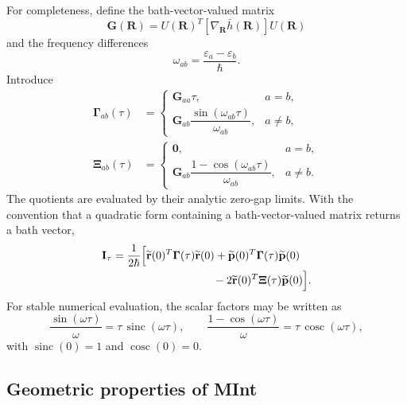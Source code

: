\documentclass[
  11pt,
  letterpaper,
  onehalfspacing,
  normalmargins,
  equalmargins,
  oneside
]{ut-thesis}
\begin{document}
For completeness, define the bath-vector-valued matrix
\begin{equation}
\mathbf G(\mathbf R)
=
U(\mathbf R)^T
\left[\nabla_{\mathbf R}\bar h(\mathbf R)\right]
U(\mathbf R)
\label{eq:ch5-G-matrix}
\end{equation}
and the frequency differences
\begin{equation}
\omega_{ab}
=
\frac{\varepsilon_a-\varepsilon_b}{\hbar}.
\label{eq:ch5-frequency-difference}
\end{equation}
Introduce
\begin{align}
\boldsymbol\Gamma_{ab}(\tau)
&=
\begin{cases}
\mathbf G_{aa}\tau,
& a=b,\\[3pt]
\mathbf G_{ab}
\dfrac{\sin(\omega_{ab}\tau)}{\omega_{ab}},
& a\neq b,
\end{cases}
\label{eq:ch5-Gamma}
\\
\boldsymbol\Xi_{ab}(\tau)
&=
\begin{cases}
\mathbf 0,
& a=b,\\[3pt]
\mathbf G_{ab}
\dfrac{1-\cos(\omega_{ab}\tau)}{\omega_{ab}},
& a\neq b.
\end{cases}
\label{eq:ch5-Xi}
\end{align}
The quotients are evaluated by their analytic zero-gap limits. With the
convention that a quadratic form containing a bath-vector-valued matrix
returns a bath vector,
\begin{align}
\mathbf I_\tau
&=
\frac{1}{2\hbar}
\Big[
\widetilde{\mathbf r}(0)^T
\boldsymbol\Gamma(\tau)
\widetilde{\mathbf r}(0)
+
\widetilde{\mathbf p}(0)^T
\boldsymbol\Gamma(\tau)
\widetilde{\mathbf p}(0)
\nonumber\\
&\hspace{3.2cm}
-
2\widetilde{\mathbf r}(0)^T
\boldsymbol\Xi(\tau)
\widetilde{\mathbf p}(0)
\Big].
\label{eq:ch5-momentum-integral-closed}
\end{align}
For stable numerical evaluation, the scalar factors may be written as
\begin{equation}
\frac{\sin(\omega\tau)}{\omega}
=
\tau\,\operatorname{sinc}(\omega\tau),
\qquad
\frac{1-\cos(\omega\tau)}{\omega}
=
\tau\,\operatorname{cosc}(\omega\tau),
\label{eq:ch5-sinc-cosc}
\end{equation}
with \(\operatorname{sinc}(0)=1\) and
\(\operatorname{cosc}(0)=0\).


\subsection{Geometric properties of MInt}
\label{subsec:ch5-mint-geometry}
\end{document}

